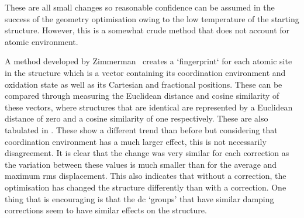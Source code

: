 These are all small changes so reasonable confidence can be assumed in the success of the geometry optimisation owing to the low temperature of the starting structure. However, this is a somewhat crude method that does not account for atomic environment. 

A method developed by Zimmerman~\cite{Ward2018} creates a `fingerprint` for each atomic site in the structure which is a vector containing its coordination environment and oxidation state as well as its Cartesian and fractional positions. These can be compared through measuring the Euclidean distance and cosine similarity of these vectors, where structures that are identical are represented by a Euclidean distance of zero and a cosine similarity of one respectively. These are also tabulated in . These show a different trend than before but considering that coordination environment has a much larger effect, this is not necessarily disagreement. It is clear that the change was very similar for each correction as the variation between these values is much smaller than for the average and maximum \acrshort{rms} displacement. This also indicates that without a correction, the optimisation has changed the structure differently than with a correction. One thing that is encouraging is that the \acrshort{dc} ‘groups’ that have similar damping corrections seem to have similar effects on the structure. 

